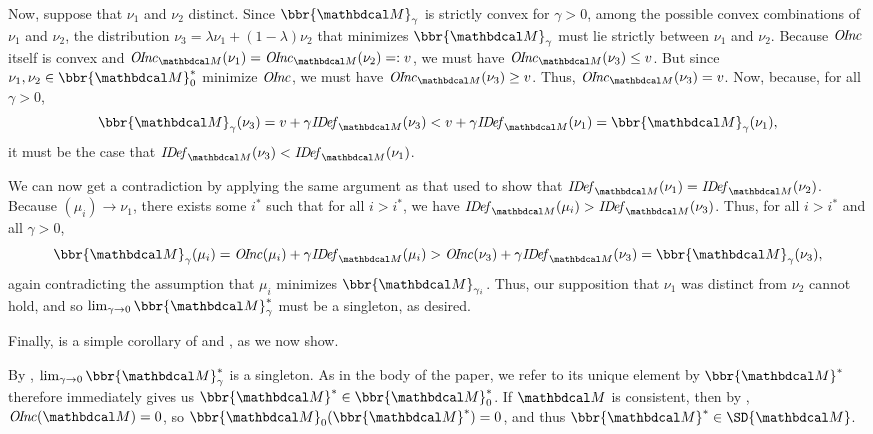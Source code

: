 \begin{subappendices}
\begin{lproof}
Now, suppose that $\nu_1$ and $\nu_2$ distinct. Since $\bbr{\dg M}_\gamma$
is strictly convex for $\gamma > 0$, among the possible convex
combinations of $\nu_1$ and $\nu_2$, the distribution $\nu_3 = \lambda
\nu_1 + (1-\lambda) \nu_2$ that minimizes $\bbr{\dg M}_\gamma$ must
lie strictly between $\nu_1$ and $\nu_2$. 
Because $\mathit{O\mskip-2.5muI\mskip-3.5mun\mskip-1.7muc}$ itself is convex and $\OInc_{\dg M}(\nu_1) = \OInc_{\dg
  M}(\nu_2) =: v$, we must have $\OInc_{\dg M}(\nu_3) \le v$. 
But since
$\nu_1,\nu_2 \in \bbr{\dg M}_0^*$ minimize $\mathit{O\mskip-2.5muI\mskip-3.5mun\mskip-1.7muc}$,
we must have $\OInc_{\dg M}(\nu_3) \ge v$.
Thus, $\OInc_{\dg M}(\nu_3) = v$. 
Now, because, for all  $\gamma > 0$,
\[ \bbr{\dg M}_\gamma(\nu_3) = v + \gamma \IDef_{\dg M}(\nu_3) 
 	< v + \gamma \IDef_{\dg M}(\nu_1) = \bbr{\dg M}_\gamma(\nu_1), \] 
it must be the case that $\IDef_{\dg M}(\nu_3) < \IDef_{\dg M}(\nu_1)$. 
        
We can now get a contradiction by applying the same argument as that used to show
that $\IDef_{\dg M}(\nu_1) =\IDef_{\dg M}(\nu_2)$.  
    Because $(\mu_{i}) \to \nu_1$, there exists some
    $i^*$ such that for all $i > i^*$, we have $\IDef_{\dg M}(\mu_{i}) >
    \IDef_{\dg M}(\nu_3)$. Thus, for all $i > i^*$ and all
    $\gamma > 0$, 
    \[ \bbr{\dg M}_\gamma(\mu_{i}) = \OInc(\mu_{i}) + \gamma\IDef_{\dg M}(\mu_{i}) > \OInc(\nu_3) 
    + \gamma \IDef_{\dg M}(\nu_3) = \bbr{\dg M}_\gamma(\nu_3),\]
again contradicting the assumption that $\mu_{i}$ minimizes
$\bbr{\dg M}_{\gamma_{i}}$.
Thus, our supposition that $\nu_1$ was distinct from $\nu_2$ cannot hold, and so
$\lim_{\gamma \to 0}\bbr{\dg M}_\gamma^*$ must be a singleton, as desired.
\end{lproof}

Finally,  is a simple corollary of  and , as we now show. 
\begin{lproof}\label{proof:consist}
By , $\lim_{\gamma \to 0}\bbr{\dg M}_\gamma^*$
is a singleton. As in the body of the paper, we refer to its unique element by $\bbr{\dg M}^*$
 therefore immediately gives us $\bbr{\dg M}^* \in \bbr{\dg M}_0^*$.  
%
If $\dg M$ is consistent, then by ,
$\OInc({\dg M}) = 0$, so $\bbr{\dg M}_0(\bbr{\dg M}^*) = 0$, and thus
$\bbr{\dg M}^* 
\in \SD{\dg M}$. 
\end{lproof}



\end{subappendices}
